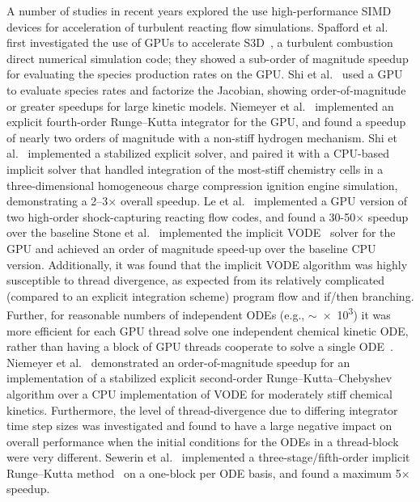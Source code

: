 \documentclass[preprint]{elsarticle}
\begin{document}
A number of studies in recent years explored the use high-performance SIMD devices for acceleration of turbulent reacting flow simulations.
Spafford et al.~\cite{Spafford:2010aa} first investigated the use of GPUs to accelerate S3D~\cite{CHEN:2009s3d}, a turbulent combustion direct numerical simulation code; they showed a sub-order of magnitude speedup for evaluating the species production rates on the GPU.
Shi et al.~\cite{Shi:2011aa} used a GPU to evaluate species rates and factorize the Jacobian, showing order-of-magnitude or greater speedups for large kinetic models.
Niemeyer et al.~\cite{Niemeyer:2011aa} implemented an explicit fourth-order Runge--Kutta integrator for the GPU, and found a speedup of nearly two orders of magnitude with a non-stiff hydrogen mechanism.
Shi et al.~\cite{Shi:2012aa} implemented a stabilized explicit solver, and paired it with a CPU-based implicit solver that handled integration of the most-stiff chemistry cells in a three-dimensional homogeneous charge compression ignition engine simulation, demonstrating a 2--3$\times$ overall speedup.
Le et al.~\cite{Le2013596} implemented a GPU version of two high-order shock-capturing reacting flow codes, and found a 30-50$\times$ speedup over the baseline 
Stone et al.~\cite{Stone:2013aa} implemented the implicit VODE~\cite{brown1989vode} solver for the GPU and achieved an order of magnitude speed-up over the baseline CPU version.
Additionally, it was found that the implicit VODE algorithm was highly susceptible to thread divergence, as expected from its relatively complicated (compared to an explicit integration scheme) program flow and if/then branching.
Further, for reasonable numbers of independent ODEs (e.g., $\sim$\num{e3}) it was more efficient for each GPU thread solve one independent chemical kinetic ODE, rather than having a block of GPU threads cooperate to solve a single ODE~\cite{Stone:2013aa}.
Niemeyer et al.~\cite{Niemeyer:2014aa} demonstrated an order-of-magnitude speedup for an implementation of a stabilized explicit second-order Runge--Kutta--Chebyshev algorithm over a CPU implementation of VODE for moderately stiff chemical kinetics.
Furthermore, the level of thread-divergence due to differing integrator time step sizes was investigated and found to have a large negative impact on overall performance when the initial conditions for the ODEs in a thread-block were very different.
Sewerin et al.~\cite{Sewerin20151375} implemented a three-stage\slash fifth-order implicit Runge--Kutta method~\cite{hairer1996solving} on a one-block per ODE basis, and found a maximum 5$\times$ speedup.
\end{document}
